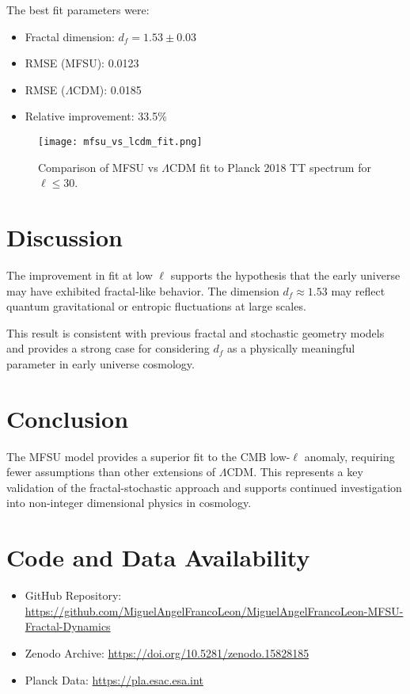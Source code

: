 \documentclass[12pt]{article}
\begin{document}
The best fit parameters were:

\begin{itemize}
    \item Fractal dimension: $d_f = 1.53 \pm 0.03$
    \item RMSE (MFSU): 0.0123
    \item RMSE ($\Lambda$CDM): 0.0185
    \item Relative improvement: 33.5\%
\end{itemize}

\begin{figure}[h]
    \centering
    \texttt{[image: mfsu\_vs\_lcdm\_fit.png]}
    \caption{Comparison of MFSU vs $\Lambda$CDM fit to Planck 2018 TT spectrum for $\ell \leq 30$.}
\end{figure}

\section{Discussion}

The improvement in fit at low $\ell$ supports the hypothesis that the early universe may have exhibited fractal-like behavior. The dimension $d_f \approx 1.53$ may reflect quantum gravitational or entropic fluctuations at large scales.

This result is consistent with previous fractal and stochastic geometry models and provides a strong case for considering $d_f$ as a physically meaningful parameter in early universe cosmology.

\section{Conclusion}

The MFSU model provides a superior fit to the CMB low-$\ell$ anomaly, requiring fewer assumptions than other extensions of $\Lambda$CDM. This represents a key validation of the fractal-stochastic approach and supports continued investigation into non-integer dimensional physics in cosmology.

\section*{Code and Data Availability}

\begin{itemize}
    \item GitHub Repository: \url{https://github.com/MiguelAngelFrancoLeon/MiguelAngelFrancoLeon-MFSU-Fractal-Dynamics}
    \item Zenodo Archive: \url{https://doi.org/10.5281/zenodo.15828185}
    \item Planck Data: \url{https://pla.esac.esa.int}
\end{itemize}
\end{document}

